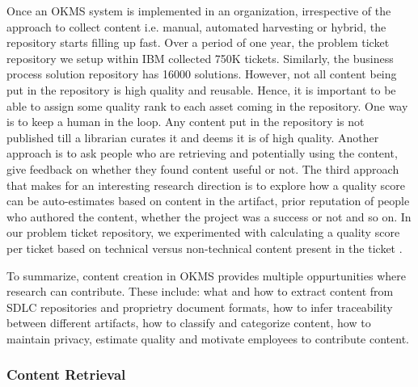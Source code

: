 Once an OKMS system is implemented in an organization, irrespective of the approach to collect content i.e. manual, automated harvesting or hybrid, the repository starts filling up fast. Over a period of one year, the problem ticket repository we setup within IBM collected 750K tickets. Similarly, the business process solution repository has 16000 solutions. However, not all content being put in the repository is high quality and reusable. Hence, it is important to be able to assign some quality rank to each asset coming in the repository. One way is to keep a human in the loop. Any content put in the repository is not published till a librarian curates it and deems it is of high quality. Another approach is to ask people who are retrieving and potentially using the content, give feedback on whether they found content useful or not. The third approach that makes for an interesting research direction is to explore how a quality score can be auto-estimates based on content in the artifact, prior reputation of people who authored the content, whether the project was a success or not and so on. In our problem ticket repository, we experimented with calculating a quality score per ticket based on technical versus non-technical content present in the ticket \cite{}.

To summarize, content creation in OKMS provides multiple oppurtunities where research can contribute. These include: what and how to extract content from SDLC repositories and proprietry document formats, how to infer traceability between different artifacts, how to classify and categorize content, how to maintain privacy, estimate quality and motivate employees to contribute content. 

\subsubsection{Content Retrieval}


